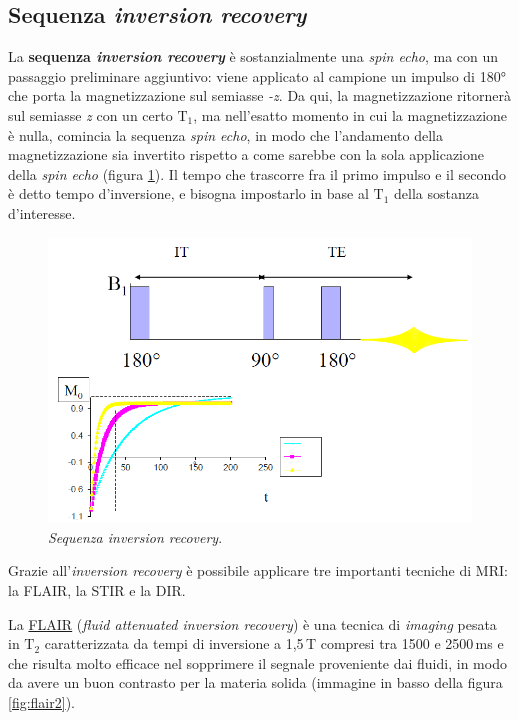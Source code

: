 \documentclass{report}
\newcommand{\figref}[1]{figura \ref{#1}}
\numberwithin{equation}{section}
\numberwithin{figure}{section}
\begin{document}
\subsection{Sequenza \textit{inversion recovery}}
La \textbf{sequenza \textit{inversion recovery}} è sostanzialmente una \textit{spin echo}, ma con un passaggio preliminare aggiuntivo: viene applicato al campione un impulso di 180° che porta la magnetizzazione sul semiasse \textit{-z}. Da qui, la magnetizzazione ritornerà sul semiasse \textit{z} con un certo $\mathrm{T_1}$, ma nell'esatto momento in cui la magnetizzazione è nulla, comincia la sequenza \textit{spin echo}, in modo che l'andamento della magnetizzazione sia invertito rispetto a come sarebbe con la sola applicazione della \textit{spin echo} (\figref{fig:inv}). Il tempo che trascorre fra il primo impulso e il secondo è detto tempo d'inversione, e bisogna impostarlo in base al $\mathrm{T_1}$ della sostanza d'interesse.

\begin{figure}[htp]
\centering
\includegraphics[scale=0.75]{immagini/inv.png}
\caption{\label{fig:inv} \textit{Sequenza inversion recovery}.}
\end{figure}

\noindent Grazie all'\textit{inversion recovery} è possibile applicare tre importanti tecniche di MRI: la FLAIR, la STIR e la DIR.

La \underline{FLAIR} (\textit{fluid attenuated inversion recovery}) è una tecnica di \textit{imaging} pesata in $\mathrm{T_2}$ caratterizzata da tempi di inversione a 1,5\,T compresi tra 1500 e 2500\,ms e che risulta molto efficace nel sopprimere il segnale proveniente dai fluidi, in modo da avere un buon contrasto per la materia solida (immagine in basso della \figref{fig:flair2}).
\end{document}
